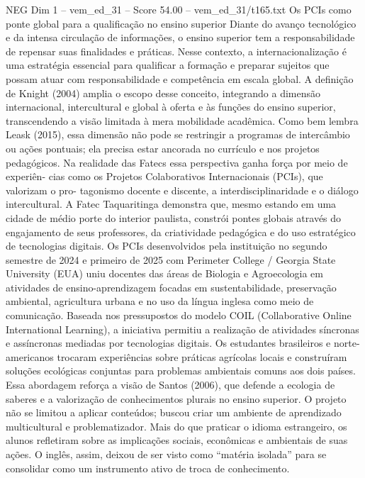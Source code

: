 \begin{textsample}{NEG Dim 1 – vem\_ed\_31 – Score 54.00 – vem\_ed\_31/t165.txt}  \label{ex:f1_neg_153}
Os PCIs como ponte global para a qualificação no ensino superior Diante do avanço tecnológico e da intensa circulação de informações, o ensino superior tem a responsabilidade de repensar suas finalidades e práticas.
Nesse contexto, a internacionalização é uma estratégia essencial para qualificar a formação e preparar sujeitos que possam atuar com responsabilidade e competência em escala global.
A definição de Knight (2004) amplia o escopo desse conceito, integrando a dimensão internacional, intercultural e global à oferta e às funções do ensino superior, transcendendo a visão limitada à mera mobilidade acadêmica.
Como bem lembra Leask (2015), essa dimensão não pode se restringir a programas de intercâmbio ou ações pontuais; ela precisa estar ancorada no currículo e nos projetos pedagógicos.
Na realidade das Fatecs essa perspectiva ganha força por meio de experiên- cias como os Projetos Colaborativos Internacionais (PCIs), que valorizam o pro- tagonismo docente e discente, a interdisciplinaridade e o diálogo intercultural.
A Fatec Taquaritinga demonstra que, mesmo estando em uma cidade de médio porte do interior paulista, constrói pontes globais através do engajamento de seus professores, da criatividade pedagógica e do uso estratégico de tecnologias digitais.
Os PCIs desenvolvidos pela instituição no segundo semestre de 2024 e primeiro de 2025 com Perimeter College / Georgia State University (EUA) uniu docentes das áreas de Biologia e Agroecologia em atividades de ensino-aprendizagem focadas em sustentabilidade, preservação ambiental, agricultura urbana e no uso da língua inglesa como meio de comunicação.
Baseada nos pressupostos do modelo COIL (Collaborative Online International Learning), a iniciativa permitiu a realização de atividades síncronas e assíncronas mediadas por tecnologias digitais.
Os estudantes brasileiros e norte-americanos trocaram experiências sobre práticas agrícolas locais e construíram soluções ecológicas conjuntas para problemas ambientais comuns aos dois países.
Essa abordagem reforça a visão de Santos (2006), que defende a ecologia de saberes e a valorização de conhecimentos plurais no ensino superior.
O projeto não se limitou a aplicar conteúdos; buscou criar um ambiente de aprendizado multicultural e problematizador.
Mais do que praticar o idioma estrangeiro, os alunos refletiram sobre as implicações sociais, econômicas e ambientais de suas ações.
O inglês, assim, deixou de ser visto como “matéria isolada” para se consolidar como um instrumento ativo de troca de conhecimento.

\end{textsample}
